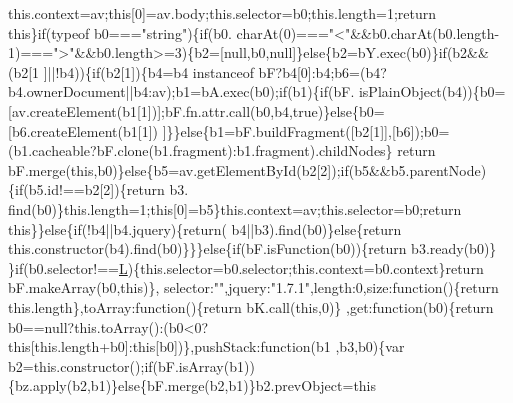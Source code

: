 \begin{DoxyCode}
      this.context=av;\textcolor{keyword}{this}[0]=av.body;this.selector=b0;this.length=1;\textcolor{keywordflow}{return} \textcolor{keyword}{this}\}\textcolor{keywordflow}{if}(typeof b0===\textcolor{stringliteral}{"string"})\{\textcolor{keywordflow}{if}(b0.
      charAt(0)===\textcolor{stringliteral}{"<"}&&b0.charAt(b0.length-1)===\textcolor{stringliteral}{">"}&&b0.length>=3)\{b2=[null,b0,null]\}\textcolor{keywordflow}{else}\{b2=bY.exec(b0)\}\textcolor{keywordflow}{if}(b2&&(b2[1
      ]||!b4))\{\textcolor{keywordflow}{if}(b2[1])\{b4=b4 instanceof bF?b4[0]:b4;b6=(b4?b4.ownerDocument||b4:av);b1=bA.exec(b0);\textcolor{keywordflow}{if}(b1)\{\textcolor{keywordflow}{if}(bF.
      isPlainObject(b4))\{b0=[av.createElement(b1[1])];bF.fn.attr.call(b0,b4,\textcolor{keyword}{true})\}\textcolor{keywordflow}{else}\{b0=[b6.createElement(b1[1])
      ]\}\}\textcolor{keywordflow}{else}\{b1=bF.buildFragment([b2[1]],[b6]);b0=(b1.cacheable?bF.clone(b1.fragment):b1.fragment).childNodes\}\textcolor{keywordflow}{
      return} bF.merge(\textcolor{keyword}{this},b0)\}\textcolor{keywordflow}{else}\{b5=av.getElementById(b2[2]);\textcolor{keywordflow}{if}(b5&&b5.parentNode)\{\textcolor{keywordflow}{if}(b5.id!==b2[2])\{\textcolor{keywordflow}{return} b3.
      find(b0)\}this.length=1;\textcolor{keyword}{this}[0]=b5\}this.context=av;this.selector=b0;\textcolor{keywordflow}{return} \textcolor{keyword}{this}\}\}\textcolor{keywordflow}{else}\{\textcolor{keywordflow}{if}(!b4||b4.jquery)\{\textcolor{keywordflow}{return}(
      b4||b3).find(b0)\}\textcolor{keywordflow}{else}\{\textcolor{keywordflow}{return} this.constructor(b4).find(b0)\}\}\}\textcolor{keywordflow}{else}\{\textcolor{keywordflow}{if}(bF.isFunction(b0))\{\textcolor{keywordflow}{return} b3.ready(b0)\}
      \}\textcolor{keywordflow}{if}(b0.selector!==\hyperlink{a00039_a38ee4c0b5f4fe2a18d0c783af540d253}{L})\{this.selector=b0.selector;this.context=b0.context\}\textcolor{keywordflow}{return} bF.makeArray(b0,\textcolor{keyword}{this})\},
      selector:\textcolor{stringliteral}{""},jquery:\textcolor{stringliteral}{"1.7.1"},length:0,size:\textcolor{keyword}{function}()\{\textcolor{keywordflow}{return} this.length\},toArray:\textcolor{keyword}{function}()\{\textcolor{keywordflow}{return} bK.call(\textcolor{keyword}{this},0)\}
      ,\textcolor{keyword}{get}:\textcolor{keyword}{function}(b0)\{\textcolor{keywordflow}{return} b0==null?this.toArray():(b0<0?this[this.length+b0]:this[b0])\},pushStack:function(b1
      ,b3,b0)\{var b2=this.constructor();\textcolor{keywordflow}{if}(bF.isArray(b1))\{bz.apply(b2,b1)\}\textcolor{keywordflow}{else}\{bF.merge(b2,b1)\}b2.prevObject=\textcolor{keyword}{this}

\end{DoxyCode}
